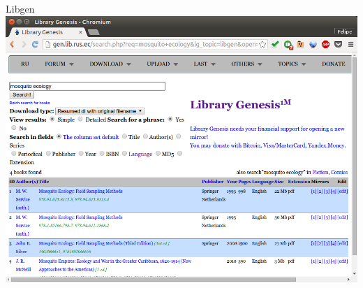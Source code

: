 \documentclass{beamer}
\begin{document}
\begin{frame}{Libgen}
  \includegraphics[height=.85\textheight]{Busca/libgen-busca2}
\end{frame}
\end{document}
